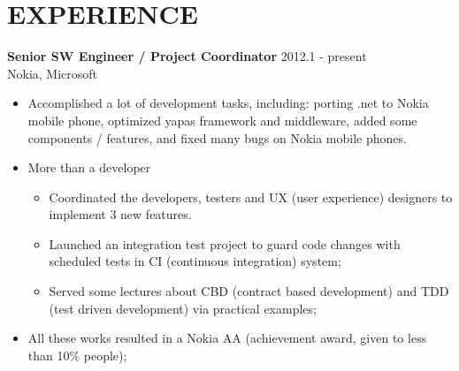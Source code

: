 
\section{EXPERIENCE}
\textbf{Senior SW Engineer / Project Coordinator} \hfill 2012.1 - present \\
        Nokia, Microsoft
        \begin{itemize}  \itemsep -2pt %
        \item Accomplished a lot of development tasks, including:
            porting .net to Nokia mobile phone, optimized yapas framework and middleware, added some components / features,
            and fixed many bugs on Nokia mobile phones.
        \item More than a developer 
            \begin{itemize}  \itemsep -2pt
                \item Coordinated the developers, testers and UX (user experience) designers to implement 3 new features.
                \item Launched an integration test project to guard code changes
                with scheduled tests in CI (continuous integration) system;
                \item Served some lectures about CBD (contract based development) and
                TDD (test driven development) via practical examples;
            \end{itemize}
        \item All these works resulted in a Nokia AA (achievement award, given to less than 10\% people);
        \end{itemize}

